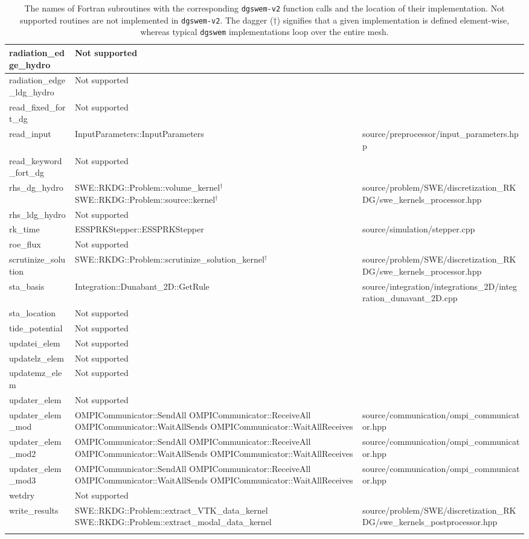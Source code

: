 {\begin{longtable}{ l | p{55mm} | p{86mm} }
\tabularnewline \hline
radiation\_edge\_hydro & Not supported &
\tabularnewline \hline
radiation\_edge\_ldg\_hydro & Not supported &	
\tabularnewline \hline
read\_fixed\_fort\_dg & Not supported &
\tabularnewline \hline
read\_input & InputParameters::InputParameters & source/preprocessor/input\_parameters.hpp
\tabularnewline \hline
read\_keyword\_fort\_dg & Not supported & 
\tabularnewline \hline
rhs\_dg\_hydro & SWE::RKDG::Problem::volume\_kernel$^\dagger$ \newline SWE::RKDG::Problem::source::kernel$^\dagger$ & source/problem/SWE/discretization_RKDG/swe\_kernels\_processor.hpp
\tabularnewline \hline
rhs\_ldg\_hydro & Not supported &	
\tabularnewline \hline
rk\_time	& ESSPRKStepper::ESSPRKStepper & source/simulation/stepper.cpp
\tabularnewline \hline
roe\_flux & Not supported &
\tabularnewline \hline
scrutinize\_solution & SWE::RKDG::Problem::scrutinize\_solution\_kernel$^\dagger$ & source/problem/SWE/discretization_RKDG/swe\_kernels\_processor.hpp
\tabularnewline \hline
sta\_basis & Integration::Dunabant\_2D::GetRule & source/integration/integrations\_2D/integration\_dunavant\_2D.cpp
\tabularnewline \hline
sta\_location & Not supported &	
\tabularnewline \hline
tide\_potential	& Not supported &	
\tabularnewline \hline
updatei\_elem & Not supported &
\tabularnewline \hline
updatelz\_elem & Not supported &
\tabularnewline \hline
updatemz\_elem & Not supported &	
\tabularnewline \hline
updater\_elem & Not supported &	
\tabularnewline \hline
updater\_elem\_mod & OMPICommunicator::SendAll \newline OMPICommunicator::ReceiveAll \newline OMPICommunicator::WaitAllSends \newline OMPICommunicator::WaitAllReceives & source/communication/ompi\_communicator.hpp
\tabularnewline \hline
updater\_elem\_mod2 & OMPICommunicator::SendAll \newline OMPICommunicator::ReceiveAll \newline OMPICommunicator::WaitAllSends \newline OMPICommunicator::WaitAllReceives & source/communication/ompi\_communicator.hpp
\tabularnewline \hline
updater\_elem\_mod3 & OMPICommunicator::SendAll \newline OMPICommunicator::ReceiveAll \newline OMPICommunicator::WaitAllSends \newline OMPICommunicator::WaitAllReceives & source/communication/ompi\_communicator.hpp
\tabularnewline \hline
wetdry & Not supported	&
\tabularnewline \hline
write\_results & SWE::RKDG::Problem::extract\_VTK\_data\_kernel \newline SWE::RKDG::Problem::extract\_modal\_data\_kernel &	 source/problem/SWE/discretization_RKDG/swe\_kernels\_postprocessor.hpp
\tabularnewline \hline \hline
\caption{The names of Fortran subroutines with the corresponding \texttt{dgswem-v2} function calls and the location of their implementation. Not supported routines are not implemented in \texttt{dgswem-v2}. The dagger ($\dagger$) signifies that a given implementation is defined element-wise, whereas typical \texttt{dgswem} implementations loop over the entire mesh.}
\label{tab:dgswemtodgswemv2}
\end{longtable}
}
